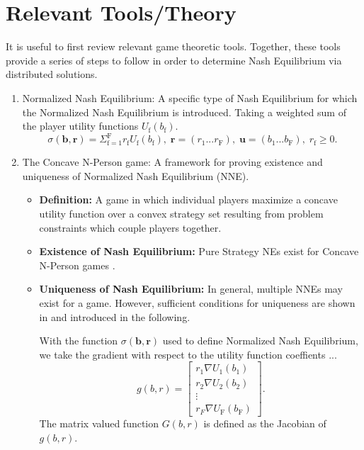 \documentclass[12pt,a4paper]{report}
\begin{document}
\section{Relevant Tools/Theory}\label{tools}
It is useful to first review relevant game theoretic tools. Together, these tools provide a series of steps to follow in order to determine Nash Equilibrium via distributed solutions. 

\begin{enumerate}
\item Normalized Nash Equilibrium: A specific type of Nash Equilibrium for which 
the Normalized Nash Equilibrium is introduced.
Taking a weighted sum of the player utility functions $U_{\mathrm{f}}(b_{\text{f}})$.
\begin{equation*}
\sigma(\mathbf{b},\mathbf{r})  = \Sigma_{\mathrm{f=1}}^{\mathrm{F}} r_{\mathrm{f}}U_{\mathrm{f}}(b_{\text{f}}),\; \mathbf{r}=(r_{\text{1}}... r_{\text{F}})
,\; \mathbf{u}=(b_{\text{1}}... b_{\text{F}})
, \; 
r_{\mathrm{f}} \geq 0.
\end{equation*}



\item The Concave N-Person game: A framework for proving existence and uniqueness of Normalized Nash Equilibrium (NNE).

\begin{itemize}
\item
\textbf{Definition:} A game in which individual players maximize a concave utility function over a convex strategy set resulting from problem constraints which couple players together.
\item 
\textbf{Existence of Nash Equilibrium:} Pure Strategy NEs exist for Concave N-Person games \cite[Thm1]{rosen1964existence}. 
\item
\textbf{Uniqueness of Nash Equilibrium:} In general, multiple NNEs may exist for a game. However, sufficient conditions for uniqueness are shown in \cite[Thm4]{rosen1964existence} and introduced in the following. 

With the function  $
\sigma(\mathbf{b},\mathbf{r})$
used to define Normalized Nash Equilibrium, we take the gradient with respect to the utility function coeffients ... 
\begin{equation}
g(b,r)= 
\begin{bmatrix}
r_1 \nabla U_{1}(b_1)
\\
r_2 \nabla U_{2}(b_2)
\\
\vdots\\
r_F \nabla U_{\text{F}}(b_{\text{F}})
\end{bmatrix}.
\end{equation}
 The matrix valued function $G(b,r) $ is defined as the Jacobian of $g(b,r) $.


\end{itemize}
\end{enumerate}
\end{document}
